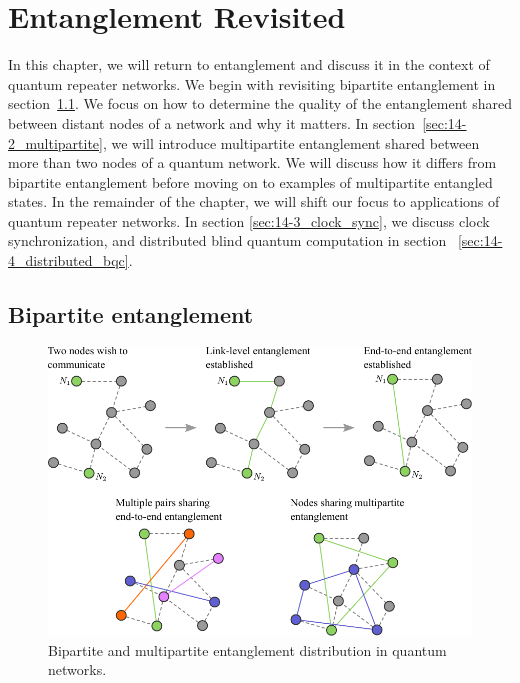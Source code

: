 \chapter{Entanglement Revisited}

In this chapter, we will return to entanglement and discuss it in the context of quantum repeater networks.
We begin with revisiting bipartite entanglement in section~\ref{sec:14-1_bipartite}.
We focus on how to determine the quality of the entanglement shared between distant nodes of a network and why it matters.
In section~\ref{sec:14-2_multipartite}, we will introduce multipartite entanglement shared between more than two nodes of a quantum network.
We will discuss how it differs from bipartite entanglement before moving on to examples of multipartite entangled states.
In the remainder of the chapter, we will shift our focus to applications of quantum repeater networks.
In section \ref{sec:14-3_clock_sync}, we discuss clock synchronization, and distributed blind quantum computation in section ~\ref{sec:14-4_distributed_bqc}.



\section{Bipartite entanglement}
\label{sec:14-1_bipartite}

\begin{figure}[t]
    \centering
    \includegraphics[width=\textwidth]{lesson14/14-1_bipartite_network.pdf}
    \caption[Bipartite and multipartite entanglement]{Bipartite and multipartite entanglement distribution in quantum networks.}
    \label{fig:14-1_bipartite_multipartite}
\end{figure}


